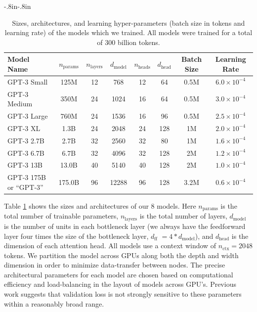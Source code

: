 \documentclass{article}
\begin{document}
\begin{table}
    
    \begin{adjustwidth}{-.8in}{-.8in}
    \begin{center}
        
        \begin{tabular}{l c c c c c c c}
        \toprule
        Model Name & $n_{\mathrm{params}}$ & $n_{\mathrm{layers}}$ & $d_{\mathrm{model}}$ & $n_{\mathrm{heads}}$ & $d_{\mathrm{head}}$  & Batch Size & Learning Rate \\
        \midrule
GPT-3 Small & 125M & 12 & 768 & 12 & 64 & 0.5M & $6.0 \times 10^{-4}$ \\                              
GPT-3 Medium & 350M & 24 & 1024 & 16 & 64 & 0.5M & $3.0 \times 10^{-4}$ \\                             
GPT-3 Large & 760M & 24 & 1536 & 16 & 96 & 0.5M & $2.5 \times 10^{-4}$ \\                             
GPT-3 XL & 1.3B & 24 & 2048 & 24 & 128 & 1M & $2.0 \times 10^{-4}$ \\                            
GPT-3 2.7B   & 2.7B & 32 & 2560 & 32 & 80 & 1M & $1.6 \times 10^{-4}$ \\                             
GPT-3 6.7B   & 6.7B & 32 & 4096 & 32 & 128 & 2M & $1.2 \times 10^{-4}$ \\                            
GPT-3 13B  & 13.0B & 40 & 5140 & 40 & 128 & 2M & $1.0 \times 10^{-4}$ \\                           
GPT-3 175B or ``GPT-3'' & 175.0B & 96 & 12288 & 96 & 128 & 3.2M & $0.6 \times 10^{-4}$ \\
        \bottomrule
        \end{tabular}
    \end{center}
    \end{adjustwidth}
    \caption{Sizes, architectures, and learning hyper-parameters (batch size in tokens and learning rate) of the models which we trained. All models were trained for a total of 300 billion tokens.}
    \label{table:param}
\end{table}

Table \ref{table:param} shows the sizes and architectures of our 8 models.  Here $n_{\mathrm{params}}$ is the total number of trainable parameters, $n_{\mathrm{layers}}$ is the total number of layers, $d_{\mathrm{model}}$ is the number of units in each bottleneck layer (we always have the feedforward layer four times the size of the bottleneck layer, $d_{\mathrm{ff}}$ $= 4 \ast d_{\mathrm{model}}$), and $d_{\mathrm{head}}$ is the dimension of each attention head.  All models use a context window of $n_{\mathrm{ctx}}=2048$ tokens.  We partition the model across GPUs along both the depth and width dimension in order to minimize data-transfer between nodes. The precise architectural parameters for each model are chosen based on computational efficiency and load-balancing in the layout of models across GPU’s.  Previous work \cite{kaplan2020scaling} suggests that validation loss is not strongly sensitive to these parameters within a reasonably broad range.
\end{document}

